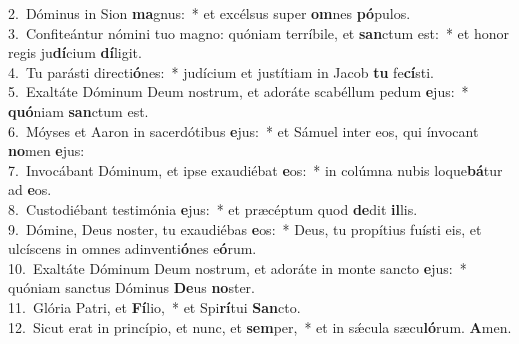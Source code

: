 {2.~}Dóminus in Sion \textbf{ma}gnus:~* et excélsus super \textbf{om}nes \textbf{pó}pulos.\\
{3.~}Confiteántur nómini tuo magno: quóniam terríbile, et \textbf{san}ctum est:~* et honor regis ju\textbf{dí}cium \textbf{dí}ligit.\\
{4.~}Tu parásti directi\textbf{ó}nes:~* judícium et justítiam in Jacob \textbf{tu} fe\textbf{cí}sti.\\
{5.~}Exaltáte Dóminum Deum nostrum, et adoráte scabéllum pedum \textbf{e}jus:~* \textbf{quó}niam \textbf{san}ctum est.\\
{6.~}Móyses et Aaron in sacerdótibus \textbf{e}jus:~* et Sámuel inter eos, qui ínvocant \textbf{no}men \textbf{e}jus:\\
{7.~}Invocábant Dóminum, et ipse exaudiébat \textbf{e}os:~* in colúmna nubis loque\textbf{bá}tur ad \textbf{e}os.\\
{8.~}Custodiébant testimónia \textbf{e}jus:~* et præcéptum quod \textbf{de}dit \textbf{il}lis.\\
{9.~}Dómine, Deus noster, tu exaudiébas \textbf{e}os:~* Deus, tu propítius fuísti eis, et ulcíscens in omnes adinventi\textbf{ó}nes e\textbf{ó}rum.\\
{10.~}Exaltáte Dóminum Deum nostrum, et adoráte in monte sancto \textbf{e}jus:~* quóniam sanctus Dóminus \textbf{De}us \textbf{no}ster.\\
{11.~}Glória Patri, et \textbf{Fí}lio,~* et Spi\textbf{rí}tui \textbf{San}cto.\\
{12.~}Sicut erat in princípio, et nunc, et \textbf{sem}per,~* et in sǽcula sæcu\textbf{ló}rum. \textbf{A}men.\\

